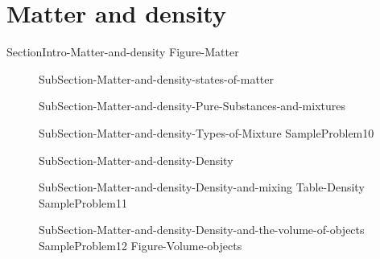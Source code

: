 \documentclass[main.tex]{subfiles}
\begin{document}
\section{Matter and density}
{SectionIntro-Matter-and-density}
{Figure-Matter}		
\sloppy\begin{description}
\item[] {SubSection-Matter-and-density-states-of-matter}
\item[]{SubSection-Matter-and-density-Pure-Substances-and-mixtures}
\item[]{SubSection-Matter-and-density-Types-of-Mixture}
{SampleProblem10}
\item[]{SubSection-Matter-and-density-Density}
\item[]{SubSection-Matter-and-density-Density-and-mixing}
{Table-Density} 
{SampleProblem11}
\item[]{SubSection-Matter-and-density-Density-and-the-volume-of-objects}
{SampleProblem12}
{Figure-Volume-objects}
\end{description}
\end{document}
